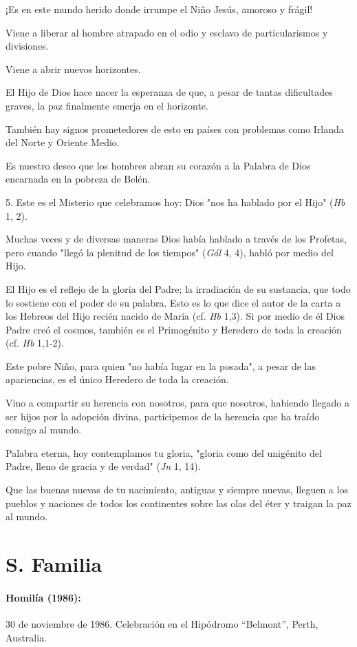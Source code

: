 ¡Es en este mundo herido donde irrumpe el Niño Jesús, amoroso y frágil!

Viene a liberar al hombre atrapado en el odio y esclavo de
particularismos y divisiones.

Viene a abrir nuevos horizontes.

El Hijo de Dios hace nacer la esperanza de que, a pesar de tantas
dificultades graves, la paz finalmente emerja en el horizonte.

También hay signos prometedores de esto en países con problemas como
Irlanda del Norte y Oriente Medio.

Es nuestro deseo que los hombres abran su corazón a la Palabra de Dios
encarnada en la pobreza de Belén.

5. Este es el Misterio que celebramos hoy: Dios "nos ha hablado por el
Hijo" (\emph{Hb} 1, 2).

Muchas veces y de diversas maneras Dios había hablado a través de los
Profetas, pero cuando "llegó la plenitud de los tiempos" (\emph{Gál} 4,
4), habló por medio del Hijo.

El Hijo es el reflejo de la gloria del Padre; la irradiación de su
sustancia, que todo lo sostiene con el poder de su palabra. Esto es lo
que dice el autor de la carta a los Hebreos del Hijo recién nacido de
María (cf. \emph{Hb} 1,3). Si por medio de él Dios Padre creó el cosmos,
también es el Primogénito y Heredero de toda la creación (cf. \emph{Hb}
1,1-2).

Este pobre Niño, para quien "no había lugar en la posada", a pesar de
las apariencias, es el único Heredero de toda la creación.

Vino a compartir su herencia con nosotros, para que nosotros, habiendo
llegado a ser hijos por la adopción divina, participemos de la herencia
que ha traído consigo al mundo.

Palabra eterna, hoy contemplamos tu gloria, "gloria como del unigénito
del Padre, lleno de gracia y de verdad" (\emph{Jn} 1, 14).

Que las buenas nuevas de tu nacimiento, antiguas y siempre nuevas,
lleguen a los pueblos y naciones de todos los continentes sobre las olas
del éter y traigan la paz al mundo.




\chapter{S. Familia}
\subsubsection{Homilía (1986): }
30 de noviembre de 1986. Celebración en el Hipódromo ``Belmont'', Perth,
Australia.

